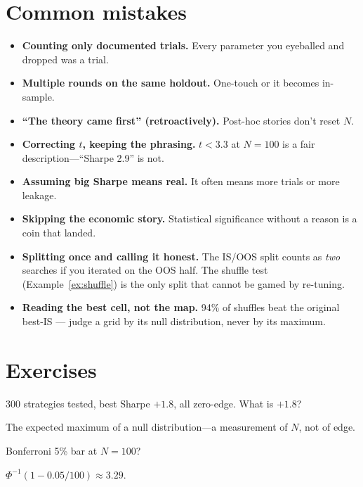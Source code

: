 \section{Common mistakes}
\begin{itemize}
\item \textbf{Counting only documented trials.} Every parameter you eyeballed and dropped
  was a trial.
\item \textbf{Multiple rounds on the same holdout.} One-touch or it becomes in-sample.
\item \textbf{``The theory came first'' (retroactively).} Post-hoc stories don't reset $N$.
\item \textbf{Correcting $t$, keeping the phrasing.} $t<3.3$ at $N{=}100$ is a fair
  description---``Sharpe 2.9'' is not.
\item \textbf{Assuming big Sharpe means real.} It often means more trials or more leakage.
\item \textbf{Skipping the economic story.} Statistical significance without a reason is
  a coin that landed.
\item \textbf{Splitting once and calling it honest.} The
IS/OOS split counts as \emph{two} searches if you iterated on the
OOS half. The shuffle test (Example~\ref{ex:shuffle}) is the only
split that cannot be gamed by re-tuning.
\item \textbf{Reading the best cell, not the map.} 94\% of
shuffles beat the original best-IS --- judge a grid by its null
distribution, never by its maximum.\end{itemize}

\section{Exercises}
\begin{exercise}[easy]
300 strategies tested, best Sharpe $+1.8$, all zero-edge. What is $+1.8$?
\end{exercise}
\begin{solution}
The expected maximum of a null distribution---a measurement of $N$, not of edge.
\end{solution}

\begin{exercise}[easy]
Bonferroni 5\% bar at $N{=}100$?
\end{exercise}
\begin{solution}
$\Phi^{-1}(1-0.05/100)\approx3.29$.
\end{solution}

